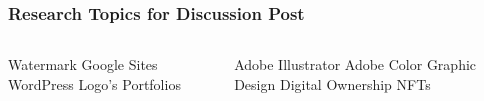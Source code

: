 \documentclass{beamer}
\begin{document}
				\begin{frame}
					\frametitle{Research Topics for Discussion Post}
					\begin{columns}
						\begin{outline}
							\1 Watermark
							\1 Google Sites
							\1 WordPress
							\1 Logo's
							\1 Portfolios
						\end{outline}
						\column{.5\textwidth}
					\begin{outline}
							\1 Adobe Illustrator
						\1 Adobe Color
						\1 Graphic Design
						\1 Digital Ownership
						\1 NFTs
					\end{outline}
					\end{columns}
				\end{frame}
	
	\section{}	
\end{document}
